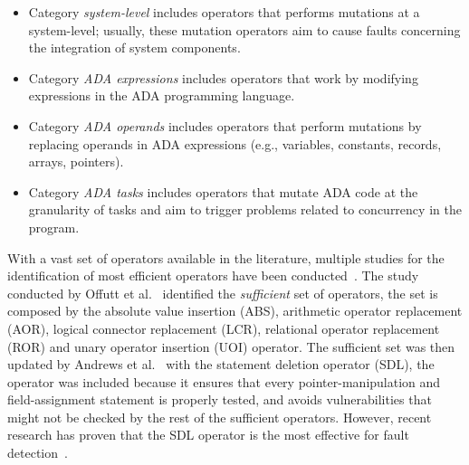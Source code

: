 \begin{itemize}
\item Category \emph{system-level} includes operators that performs mutations at a system-level; usually, these mutation operators aim to cause faults concerning the integration of system components. 
\item Category \emph{ADA expressions} includes operators that work by modifying expressions in the ADA programming language. 
\item Category \emph{ADA operands} includes operators that perform mutations by replacing operands in ADA expressions (e.g., variables, constants, records, arrays, pointers).
\item Category \emph{ADA tasks} includes operators that mutate ADA code at the granularity of tasks and aim to trigger problems related to concurrency in the program.
\end{itemize}

With a vast set of operators available in the literature, multiple studies for the identification of most efficient operators have been conducted~\cite{rothermel1996experimental}. The study conducted by Offutt et al.~\cite{rothermel1996experimental} identified the \emph{sufficient} set of operators, the set is composed by the absolute value insertion (ABS), arithmetic operator replacement (AOR), logical connector replacement (LCR), relational operator replacement (ROR) and unary operator insertion (UOI) operator. 
The sufficient set was then updated by Andrews et al.~\cite{andrews2005mutation} with the statement deletion operator (SDL), the operator was included because it ensures that every pointer-manipulation and field-assignment statement is properly tested, and avoids vulnerabilities that might not be checked by the rest of the sufficient operators. However, recent research has proven that the SDL operator is the most effective for fault detection~\cite{delamaro2014designing}. 

